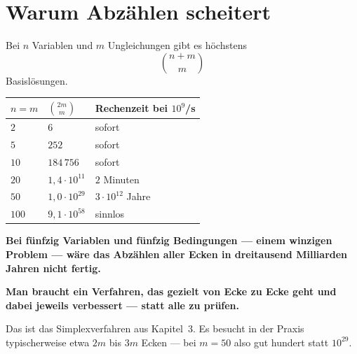 \section{Warum Abzählen scheitert}

\begin{warnung}
Bei $n$ Variablen und $m$ Ungleichungen gibt es höchstens
\[ \binom{n+m}{m} \]
Basislösungen.

\begin{center}
{\small
\renewcommand{\arraystretch}{1.48}
\begin{tabular}{@{}P{1.6cm}P{2.4cm}P{3.2cm}@{}}
\toprule
$n = m$ & $\binom{2m}{m}$ & \textbf{Rechenzeit bei $10^{9}$/s}\\
\midrule
$2$ & $6$ & sofort\\
$5$ & $252$ & sofort\\
$10$ & $184\,756$ & sofort\\
$20$ & $1{,}4\cdot10^{11}$ & $2$ Minuten\\
$50$ & $1{,}0\cdot10^{29}$ & \textcolor{akzent}{$3\cdot10^{12}$ Jahre}\\
$100$ & $9{,}1\cdot10^{58}$ & \textcolor{akzent}{sinnlos}\\
\bottomrule
\end{tabular}}
\end{center}

\begin{center}
\begin{minipage}{0.9\textwidth}
\textbf{Bei fünfzig Variablen und fünfzig Bedingungen --- einem winzigen Problem --- wäre das Abzählen aller Ecken in dreitausend Milliarden Jahren nicht fertig.}
\end{minipage}
\end{center}

\begin{center}
\begin{minipage}{0.88\textwidth}
\end{minipage}
\end{center}

\begin{center}
\begin{minipage}{0.9\textwidth}
\textbf{Man braucht ein Verfahren, das gezielt von Ecke zu Ecke geht und dabei jeweils verbessert --- statt alle zu prüfen.}
\end{minipage}
\end{center}

Das ist das Simplexverfahren aus Kapitel~3. Es besucht in der Praxis typischerweise etwa $2m$ bis $3m$ Ecken --- bei $m=50$ also gut hundert statt $10^{29}$.
\end{warnung}

